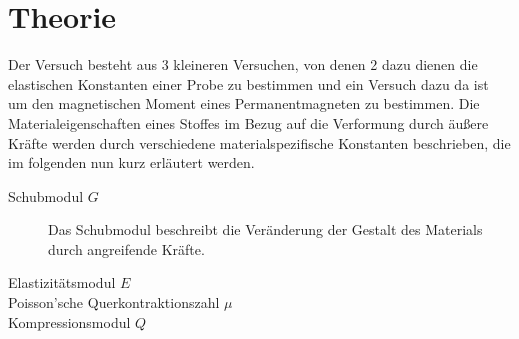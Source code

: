 \section{Theorie}
\label{sec:Theorie}
Der Versuch besteht aus 3 kleineren Versuchen, von denen 2 dazu dienen die elastischen Konstanten einer Probe zu bestimmen und ein Versuch dazu da ist um den magnetischen Moment eines Permanentmagneten zu bestimmen.
Die Materialeigenschaften eines Stoffes im Bezug auf die Verformung durch äußere Kräfte werden durch verschiedene materialspezifische Konstanten beschrieben, die im folgenden nun kurz erläutert werden.
\begin{description}
    \item[Schubmodul $G$]
        Das Schubmodul beschreibt die Veränderung der Gestalt des Materials durch angreifende Kräfte.
    \item[Elastizitätsmodul $E$]
    \item[Poisson'sche Querkontraktionszahl $\mu$]
    \item[Kompressionsmodul $Q$]
\end{description}